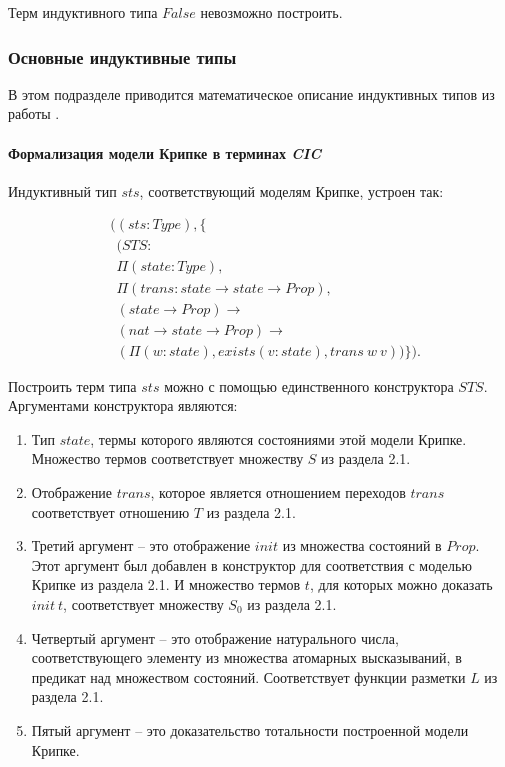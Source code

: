 \documentclass[12pt]{article}
\begin{document}
Терм индуктивного типа $False$ невозможно построить.

\subsubsection{Основные индуктивные типы}
В этом подразделе приводится математическое описание индуктивных типов из работы \cite{thesis}\cite{thesis_article}\cite{thesisgithub}.

\paragraph{Формализация модели Крипке в терминах \textit{CIC}}\mbox{}

Индуктивный тип $sts$, соответствующий моделям Крипке, устроен так:


\begin{align*}
& ((sts:Type), \{ \\ 
& \ \ (STS: \\
& \ \ \Pi(state:Type), \\ 
& \ \ \Pi(trans : state \xrightarrow{} state \xrightarrow{} Prop), \\
& \ \ (state \xrightarrow{} Prop) \xrightarrow{} \\ 
& \ \ (nat \xrightarrow{} state \xrightarrow{} Prop) \xrightarrow{} \\
& \ \ (\Pi (w : state), exists (v : state), trans\ w\ v)) \}).
\end{align*}

Построить терм типа $sts$ можно с помощью единственного конструктора $STS$. Аргументами конструктора являются:
\begin{enumerate}
    \item Тип $state$, термы которого являются состояниями этой модели Крипке. Множество термов соответствует множеству $S$  из раздела 2.1.
    \item Отображение $trans$, которое является отношением переходов $trans$ соответствует отношению $T$ из раздела 2.1.
    \item Третий аргумент -- это отображение $init$ из множества состояний в $Prop$. Этот аргумент был добавлен в конструктор для соответствия с моделью Крипке из раздела 2.1. И множество термов $t$, для которых можно доказать $init\ t$, соответствует множеству $S_0$ из раздела 2.1.
    \item Четвертый аргумент -- это отображение натурального числа, соответствующего элементу из множества атомарных высказываний, в предикат над множеством состояний. Соответствует функции разметки $L$ из раздела 2.1. 
    \item Пятый аргумент -- это доказательство тотальности построенной модели Крипке.
\end{enumerate}
\end{document}
